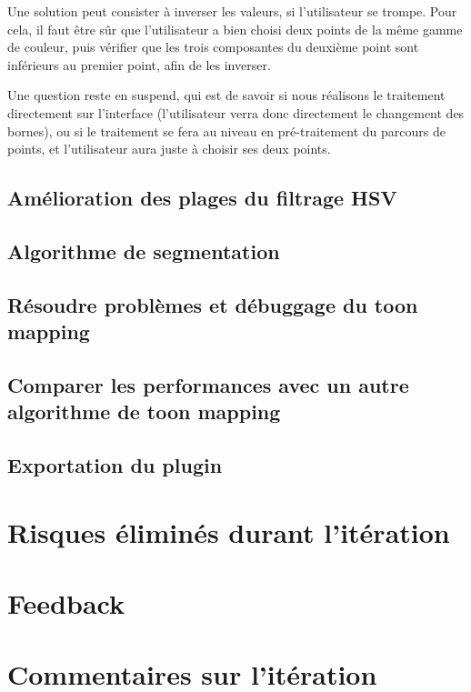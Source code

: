 \documentclass[12pt,titlepage,french]{article}
\begin{document}
Une solution peut consister à inverser les valeurs, si l'utilisateur se trompe. Pour cela, il faut être sûr que l'utilisateur a bien choisi deux points de la même gamme de couleur, puis vérifier que les trois composantes du deuxième point sont inférieurs au premier point, afin de les inverser. \newline

Une question reste en suspend, qui est de savoir si nous réalisons le traitement directement sur l'interface (l'utilisateur verra donc directement le changement des bornes), ou si le traitement se fera au niveau en pré-traitement du parcours de points, et l'utilisateur aura juste à choisir ses deux points.

\subsection{Amélioration des plages du filtrage HSV}

\subsection{Algorithme de segmentation}

\subsection{Résoudre problèmes et débuggage du toon mapping}

\subsection{Comparer les performances avec un autre algorithme de toon mapping}

\subsection{Exportation du plugin}

\section{Risques éliminés durant l'itération}


\section{Feedback}

\section{Commentaires sur l'itération}
\end{document}

